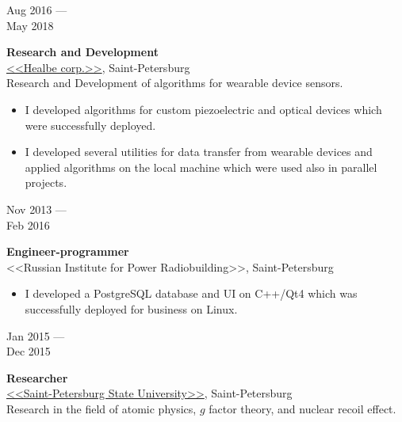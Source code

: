 \documentclass[10pt,a4paper]{article}
\newcommand{\lmpratio}{0.15}
\newcommand{\rmpratio}{0.74}
\newcommand{\vSpace}{0.5cm}
\newcommand{\horizontalSpace}{0.05\textwidth}
\newcommand{\sectionMain}[1]{\textbf{#1}}
\begin{document}
	\begin{minipage}[t]{\lmpratio\textwidth}
		Aug 2016 --- \\May 2018
	\end{minipage}
	\hspace{\horizontalSpace}
	\begin{minipage}[t]{\rmpratio\textwidth}
		\sectionMain{Research and Development}\\
		\href{https://healbe.com/}{<<Healbe corp.>>}, Saint-Petersburg\\[0.1cm]	
  
Research and Development of algorithms for wearable device sensors.
		\begin{itemize}
                \item 
I developed algorithms for custom piezoelectric and optical devices which were successfully deployed.
                \item 
I developed several utilities for data transfer from wearable devices and applied algorithms on the local machine which were used also in parallel projects.
            \end{itemize}
		 
		
	\end{minipage}	
	\vspace{\vSpace}


        \begin{minipage}[t]{\lmpratio\textwidth}
		Nov 2013 --- \\Feb 2016
	\end{minipage}
	\hspace{\horizontalSpace}
	\begin{minipage}[t]{\rmpratio\textwidth}
		\sectionMain{Engineer-programmer}\\
		<<Russian Institute for Power Radiobuilding>>, Saint-Petersburg\\[0.1cm]
            \begin{itemize}
                \item
I developed a PostgreSQL database and UI on C++/Qt4 which was successfully deployed for business on Linux.
            \end{itemize}

	\end{minipage}

		\vspace{\vSpace}
	
	\begin{minipage}[t]{\lmpratio\textwidth}
		Jan 2015 --- \\Dec 2015
	\end{minipage}
	\hspace{\horizontalSpace}
	\begin{minipage}[t]{\rmpratio\textwidth}
		\sectionMain{Researcher}\\
		\href{http://english.spbu.ru/}{<<Saint-Petersburg State University>>}, Saint-Petersburg\\[0.5cm]		
		Research in the field of atomic physics, $g$ factor theory, and nuclear recoil effect. \\

	\end{minipage}
	\vspace{\vSpace}
\end{document}
